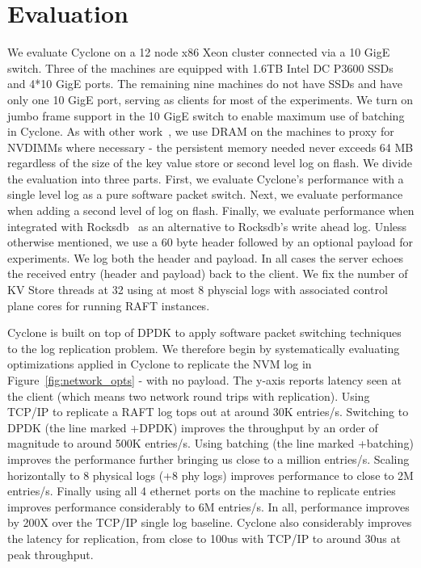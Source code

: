 \documentclass[pageno]{jpaper}
\begin{document}
\section{Evaluation}
\label{sec:evaluation}
We evaluate Cyclone on a 12 node x86 Xeon cluster connected via a 10 GigE
switch. Three of the machines are equipped with 1.6TB Intel DC P3600 SSDs and
4*10 GigE ports. The remaining nine machines do not have SSDs and have only one
10 GigE port, serving as clients for most of the experiments. We turn on jumbo
frame support in the 10 GigE switch to enable maximum use of batching in
Cyclone. As with other work~\cite{faast}, we use DRAM on the machines to proxy
for NVDIMMs where necessary - the persistent memory needed never exceeds 64 MB
regardless of the size of the key value store or second level log on flash. We
divide the evaluation into three parts. First, we evaluate Cyclone's performance
with a single level log as a pure software packet switch. Next, we evaluate
performance when adding a second level of log on flash. Finally, we evaluate
performance when integrated with Rocksdb~\cite{rocksdb} as an alternative to
Rocksdb's write ahead log. Unless otherwise mentioned, we use a 60 byte header
followed by an optional payload for experiments. We log both the header and
payload. In all cases the server echoes the received entry (header and payload)
back to the client. We fix the number of KV Store threads at 32 using at most 8
physcial logs with associated control plane cores for running RAFT instances.

Cyclone is built on top of DPDK to apply software packet switching techniques to
the log replication problem. We therefore begin by systematically evaluating
optimizations applied in Cyclone to replicate the NVM log in
Figure~\ref{fig:network_opts} - with no payload. The y-axis reports latency seen
at the client (which means two network round trips with replication). Using
TCP/IP to replicate a RAFT log tops out at around 30K entries/s.  Switching to
DPDK (the line marked +DPDK) improves the throughput by an order of magnitude to
around 500K entries/s. Using batching (the line marked +batching) improves the
performance further bringing us close to a million entries/s. Scaling
horizontally to 8 physical logs (+8 phy logs) improves performance to close to
2M entries/s. Finally using all 4 ethernet ports on the machine to replicate
entries improves performance considerably to 6M entries/s. In all, performance
improves by 200X over the TCP/IP single log baseline. Cyclone also considerably
improves the latency for replication, from close to 100us with TCP/IP to around
30us at peak throughput.
\end{document}

